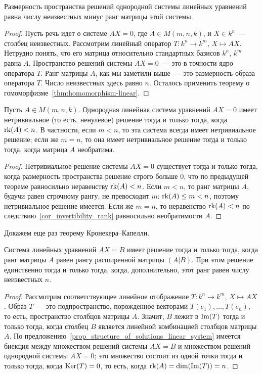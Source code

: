 \begin{proposition}
Размерность пространства решений однородной системы линейных уравнений
равна числу неизвестных минус ранг матрицы этой системы.
\end{proposition}
\begin{proof}
Пусть речь идет о системе $AX=0$, где $A\in M(m,n,k)$, и $X\in k^n$~---
столбец неизвестных. Рассмотрим линейный оператор
$T\colon k^n\to k^m$, $X\mapsto AX$. Нетрудно понять, что его матрица
относительно стандартных базисов $k^n$, $k^m$ равна $A$.
Пространство решений системы $AX=0$~--- это в точности ядро оператора
$T$. Ранг матрицы $A$, как мы заметили выше~--- это размерность
образа оператора $T$. Число неизвестных здесь равно $n$.
Осталось применить теорему о гомоморфизме~\ref{thm:homomorphism-linear}.
\end{proof}

\begin{corollary}
Пусть $A\in M(m,n,k)$.
Однородная линейная система уравнений $AX=0$ имеет нетривиальное (то
есть, ненулевое) решение тогда и только тогда, когда $\operatorname{rk}(A)<n$. В
частности, если $m<n$, то эта система всегда имеет нетривиальное
решение; если же $m=n$, то она имеет нетривиальное решение тогда и
только тогда, когда матрица $A$ необратима.
\end{corollary}
\begin{proof}
Нетривиальное решение системы $AX=0$ существует тогда и только тогда,
когда размерность пространства решение строго больше $0$, что по
предыдущей теореме равносильно неравенству $\operatorname{rk}(A)<n$. Если $m<n$, то
ранг матрицы $A$, будучи равен строчному рангу, не превосходит $m$:
$\operatorname{rk}(A)\leq m<n$, поэтому нетривиальное решение имеется. Если же
$m=n$, то неравенство $\operatorname{rk}(A)<n$ по
следствию~\ref{cor_invertibility_rank} равносильно необратимости $A$.
\end{proof}

Докажем еще раз теорему Кронекера--Капелли.
\begin{theorem}\label{thm_kronecker_kapelli_2}
Система линейных уравнений $AX=B$ имеет решение тогда и только тогда,
когда ранг матрицы $A$ равен рангу расширенной матрицы $(A|B)$. При
этом решение единственно тогда и только тогда, когда, дополнительно,
этот ранг равен числу неизвестных $n$.
\end{theorem}
\begin{proof}
Рассмотрим соответствующее линейное отображение $T\colon k^n\to
k^m$, $X\mapsto AX$.
Образ $T$~--- это подпространство, порожденное векторами
$T(e_1),\dots,T(e_n)$, то есть, пространство столбцов матрицы
$A$. Значит, $B$ лежит в $\operatorname{Im}(T)$ тогда и только тогда, когда
столбец $B$ является линейной комбинацией столбцов матрицы $A$. По
предложению~\ref{prop_structure_of_solutions_linear_system} имеется
биекция между множеством решений системы
$AX=B$ и множеством решений однородной системы $AX=0$; это множество
состоит из одной точки тогда и только тогда, когда $\operatorname{Ker}(T)=0$, то
есть, когда $\operatorname{rk}(A)=\dim(\operatorname{Im}(T))=n$.
\end{proof}
